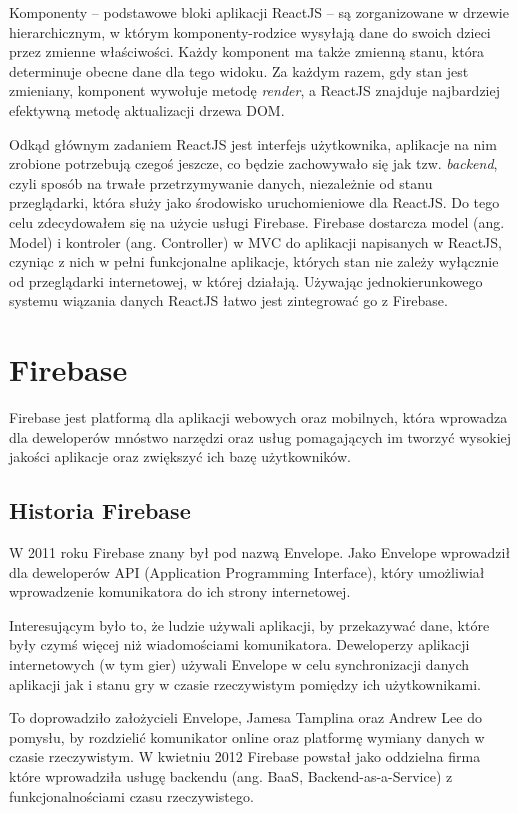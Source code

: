 Komponenty – podstawowe bloki aplikacji ReactJS – są zorganizowane w drzewie hierarchicznym,
w którym komponenty-rodzice wysyłają dane do swoich dzieci przez zmienne właściwości.
Każdy komponent ma także zmienną stanu, która determinuje obecne dane dla tego widoku.
Za każdym razem, gdy stan jest zmieniany, komponent wywołuje metodę \textit{render},
a ReactJS znajduje najbardziej efektywną metodę aktualizacji drzewa DOM\@.

Odkąd głównym zadaniem ReactJS jest interfejs użytkownika,
aplikacje na nim zrobione potrzebują czegoś jeszcze,
co będzie zachowywało się jak tzw. \textit{backend}, czyli sposób na trwałe
przetrzymywanie danych, niezależnie od stanu przeglądarki, która służy jako
środowisko uruchomieniowe dla ReactJS\@.
Do tego celu zdecydowałem się na użycie usługi Firebase.
Firebase dostarcza model (ang. Model) i kontroler (ang. Controller) w MVC
do aplikacji napisanych w ReactJS, czyniąc z nich w pełni funkcjonalne aplikacje,
których stan nie zależy wyłącznie od przeglądarki internetowej, w której działają.
Używając  jednokierunkowego systemu wiązania danych ReactJS łatwo jest zintegrować go z Firebase.
~\cite{www_react}

\section{Firebase}

Firebase jest platformą dla aplikacji webowych oraz mobilnych, która wprowadza
dla deweloperów mnóstwo narzędzi oraz usług pomagających im tworzyć wysokiej jakości
aplikacje oraz zwiększyć ich bazę użytkowników.

\subsection{Historia Firebase}

W 2011 roku Firebase znany był pod nazwą Envelope.
Jako Envelope wprowadził dla deweloperów API (Application Programming Interface),
który umożliwiał wprowadzenie komunikatora do ich strony internetowej.

Interesującym było to, że ludzie używali aplikacji, by przekazywać dane,
które były czymś więcej niż wiadomościami komunikatora.
Deweloperzy aplikacji internetowych (w tym gier) używali Envelope
w celu synchronizacji danych aplikacji jak i stanu gry
w czasie rzeczywistym pomiędzy ich użytkownikami.

To doprowadziło założycieli Envelope, Jamesa Tamplina oraz Andrew Lee
do pomysłu, by rozdzielić komunikator online oraz platformę wymiany danych w czasie rzeczywistym.
W kwietniu 2012 Firebase powstał jako oddzielna firma które wprowadziła usługę backendu
(ang. BaaS, Backend-as-a-Service) z funkcjonalnościami czasu rzeczywistego.

